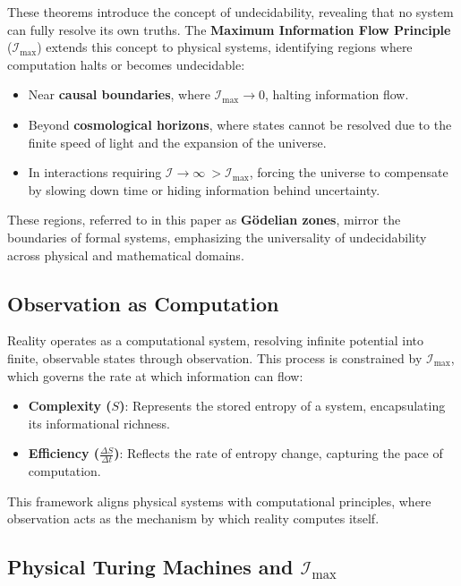\documentclass[12pt]{article}
\begin{document}
These theorems introduce the concept of undecidability, revealing that no system can fully resolve its own truths. The \textbf{Maximum Information Flow Principle} (\(\mathcal{I}_{\text{max}}\)) extends this concept to physical systems, identifying regions where computation halts or becomes undecidable:
\begin{itemize}
    \item Near \textbf{causal boundaries}, where \(\mathcal{I}_{\text{max}} \to 0\), halting information flow.
    \item Beyond \textbf{cosmological horizons}, where states cannot be resolved due to the finite speed of light and the expansion of the universe.
    \item In interactions requiring \(\mathcal{I} \to \infty\ > \mathcal{I}_{\text{max}}\), forcing the universe to compensate by slowing down time or hiding information behind uncertainty.
\end{itemize}

These regions, referred to in this paper as \textbf{Gödelian zones}, mirror the boundaries of formal systems, emphasizing the universality of undecidability across physical and mathematical domains.

\subsection{Observation as Computation}

Reality operates as a computational system, resolving infinite potential into finite, observable states through observation. This process is constrained by \(\mathcal{I}_{\text{max}}\), which governs the rate at which information can flow:
\begin{itemize}
    \item \textbf{Complexity (\(S\))}: Represents the stored entropy of a system, encapsulating its informational richness.
    \item \textbf{Efficiency (\(\frac{\Delta S}{\Delta t}\))}: Reflects the rate of entropy change, capturing the pace of computation.
\end{itemize}

This framework aligns physical systems with computational principles, where observation acts as the mechanism by which reality computes itself.


\subsection{Physical Turing Machines and \(\mathcal{I}_{\text{max}}\)}
\end{document}
